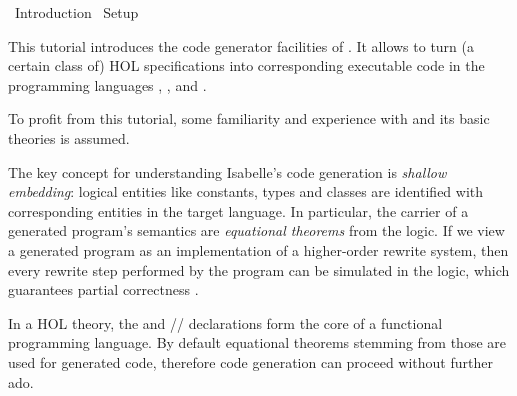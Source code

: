 %
\begin{isabellebody}%
\def\isabellecontext{Introduction}%
%
\isadelimtheory
%
\endisadelimtheory
%
\isatagtheory
{}\isamarkupfalse%
\ Introduction\isanewline
{}\ Setup\isanewline
{}%
\endisatagtheory
{\isafoldtheory}%
%
\isadelimtheory
%
\endisadelimtheory
%
\isamarkuptrue%
%
\begin{isamarkuptext}%
This tutorial introduces the code generator facilities of .  It allows to turn (a certain class of) HOL
  specifications into corresponding executable code in the programming
  languages  \cite{SML},  \cite{OCaml},
   \cite{haskell-revised-report} and 
  \cite{scala-overview-tech-report}.

  To profit from this tutorial, some familiarity and experience with
  \hyperlink{theory.HOL}{\mbox{}} \cite{isa-tutorial} and its basic theories is assumed.%
\end{isamarkuptext}%
\isamarkuptrue%
%
\isamarkuptrue%
%
\begin{isamarkuptext}%
The key concept for understanding Isabelle's code generation is
  \emph{shallow embedding}: logical entities like constants, types and
  classes are identified with corresponding entities in the target
  language.  In particular, the carrier of a generated program's
  semantics are \emph{equational theorems} from the logic.  If we view
  a generated program as an implementation of a higher-order rewrite
  system, then every rewrite step performed by the program can be
  simulated in the logic, which guarantees partial correctness
  \cite{Haftmann-Nipkow:2010:code}.%
\end{isamarkuptext}%
\isamarkuptrue%
%
\isamarkuptrue%
%
\begin{isamarkuptext}%
In a HOL theory, the \hypertarget{command.datatype}{\hyperlink{command.datatype}{\mbox{}}} and \hypertarget{command.definition}{\hyperlink{command.definition}{\mbox{}}}/\hypertarget{command.primrec}{\hyperlink{command.primrec}{\mbox{}}}/\hypertarget{command.fun}{\hyperlink{command.fun}{\mbox{}}} declarations
  form the core of a functional programming language.  By default
  equational theorems stemming from those are used for generated code,
  therefore  code generation can proceed without further
  ado.


\end{isamarkuptext}
\end{isabellebody}
